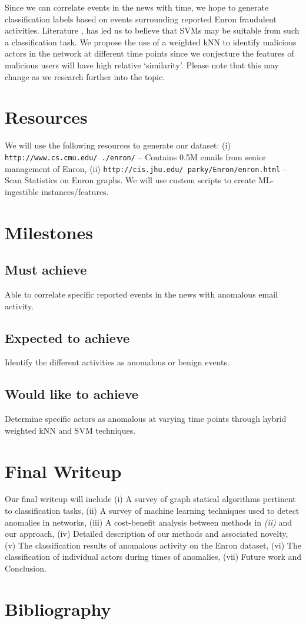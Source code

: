 \documentclass[10pt]{article}
\begin{document}
Since we can correlate events in the news with time, we hope to generate classification labels based on events
surrounding reported Enron fraudulent activities. Literature \cite{shon2007hybrid}, \cite{shon2005machine} has 
led us to believe that SVMs may be suitable from such a classification task. We propose the use of a weighted kNN to 
identify malicious actors in the network at different time points since we conjecture the features of malicious users will 
have high relative `similarity'. Please note that this may change as we research further into the topic.

\section{Resources}
We will use the following resources to generate our dataset: (i) \texttt{http://www.cs.cmu.edu/~./enron/} -- Contains 0.5M 
emails from senior management of Enron, (ii) \texttt{http://cis.jhu.edu/~parky/Enron/enron.html} -- Scan Statistics on
Enron graphs. We will use custom scripts to create ML-ingestible instances/features.

\section{Milestones}
\subsection{Must achieve}
Able to correlate specific reported events in the news with anomalous email activity. 
\subsection{Expected to achieve}
Identify the different activities as anomalous or benign events.
\subsection{Would like to achieve}
Determine specific actors as anomalous at varying time points through hybrid weighted kNN and SVM techniques.

\section{Final Writeup}
Our final writeup will include (i) A survey of graph statical algorithms pertinent to classification tasks, 
(ii) A survey of machine learning techniques used to detect anomalies in networks, 
(iii) A cost-benefit analysis between methods in \textit{(ii)} and our approach,
(iv) Detailed description of our methods and associated novelty,
(v) The classification results of anomalous activity on the Enron dataset,
(vi) The classification of individual actors during times of anomalies,
(vii) Future work and Conclusion.
 
\section{Bibliography}

{\small

}
\end{document}
